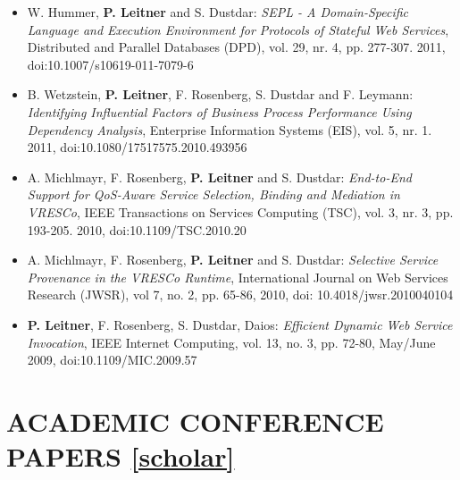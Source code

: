 \documentclass[paper=letter,fontsize=11pt]{scrartcl} %
\newcommand{\NewPart}[2]{\section*{\uppercase{#1} #2}}
\begin{document}
\begin{itemize}
\item W. Hummer, \textbf{P. Leitner} and S. Dustdar: \emph{SEPL - A
Domain-Specific Language and Execution Environment for Protocols of Stateful Web
Services}, Distributed and Parallel Databases (DPD), vol. 29, nr. 4, pp.
277-307. 2011, doi:10.1007/s10619-011-7079-6
\item B. Wetzstein, \textbf{P. Leitner}, F. Rosenberg, S. Dustdar and F. Leymann: \emph{Identifying Influential Factors of Business Process Performance Using Dependency Analysis}, Enterprise Information Systems (EIS), vol. 5, nr. 1. 2011, doi:10.1080/17517575.2010.493956
\item A. Michlmayr, F. Rosenberg, \textbf{P. Leitner} and S. Dustdar: \emph{End-to-End Support for QoS-Aware Service Selection, Binding and Mediation in VRESCo}, IEEE Transactions on Services Computing (TSC), vol. 3, nr. 3, pp. 193-205. 2010, doi:10.1109/TSC.2010.20
\item A. Michlmayr, F. Rosenberg, \textbf{P. Leitner} and S. Dustdar: \emph{Selective Service Provenance in the VRESCo Runtime}, International Journal on Web Services Research (JWSR), vol 7, no. 2, pp. 65-86, 2010, doi: 10.4018/jwsr.2010040104
\item \textbf{P. Leitner}, F. Rosenberg, S. Dustdar, Daios: \emph{Efficient Dynamic Web Service Invocation}, IEEE Internet Computing, vol. 13, no. 3, pp. 72-80, May/June 2009, doi:10.1109/MIC.2009.57
\end{itemize}

\NewPart{Academic Conference Papers}{\href{https://scholar.google.ch/citations?user=wZ9f8CAAAAAJ}{[scholar]}}
\end{document}
